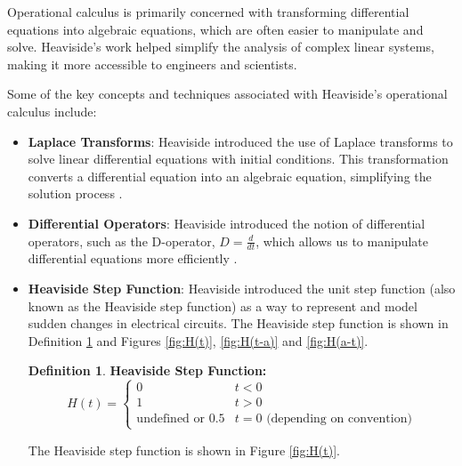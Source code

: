\documentclass{article}
\theoremstyle{definition}
\newtheorem{definition}{Definition}[section]
\begin{document}
\begin{itemize}
\medskip
\noindent
Operational calculus is primarily concerned with transforming
differential equations into algebraic equations, which are often
easier to manipulate and solve. Heaviside's work helped simplify
the analysis of complex linear systems, making it more accessible
to engineers and scientists.

\medskip
\noindent
Some of the key concepts and techniques associated with
Heaviside's operational calculus include:

\begin{itemize}
\item {\bf Laplace Transforms}: Heaviside introduced the use of
Laplace transforms to solve linear differential equations with
initial conditions. This transformation converts a differential
equation into an algebraic equation, simplifying the solution
process \cite{dmm:dirac_delta_and_laplace_transform}.

\medskip
\item {\bf Differential Operators}: Heaviside introduced the
notion of differential operators, such as the D-operator, 
$D= \frac{d}{dt}$, which allows us to manipulate differential 
equations more efficiently 
\cite{d-operator,wikipedia:differential_operator}.

\medskip
\item {\bf Heaviside Step Function}: Heaviside introduced the
unit step function (also known as the Heaviside step function) 
as a way to represent and model sudden changes in electrical
circuits. The Heaviside step function is shown in Definition 
\ref{def:heaviside_function} and Figures \ref{fig:H(t)}, 
\ref{fig:H(t-a)} and \ref{fig:H(a-t)}.

\bigskip
\begin{definition} {\bf Heaviside Step Function:}
\bigskip
\begin{equation*}
H(t) =
 \begin{cases} 
   0 & t < 0  \\
   1 & t > 0 \\
   \text{undefined or 0.5} & t = 0 \text{ (depending on convention)}
   \end{cases}
\end{equation*}
\label{def:heaviside_function}
\end{definition}

\bigskip
\noindent
The Heaviside step function is shown in Figure \ref{fig:H(t)}.


\end{itemize}
\end{itemize}
\end{document}
